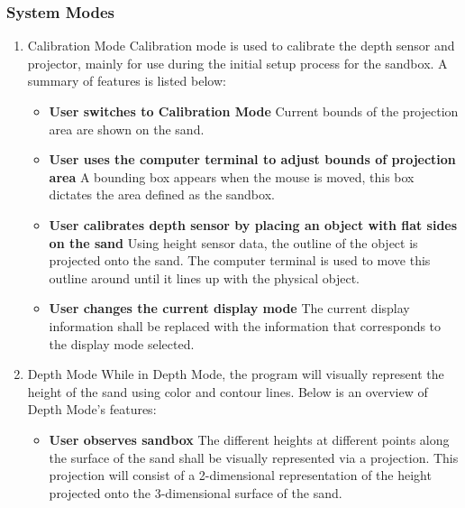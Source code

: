 
\subsubsection{System Modes}
\begin{enumerate}
\item{Calibration Mode}
Calibration mode is used to calibrate the depth sensor and projector, mainly for use during the initial set\-up process for the sandbox. A summary of features is listed below:

\begin{itemize}
\item \textbf{User switches to Calibration Mode}
Current bounds of the projection area are shown on the sand.

\item \textbf{User uses the computer terminal to adjust bounds of projection area}
A bounding box appears when the mouse is moved, this box dictates the area defined as the sandbox.

\item \textbf{User calibrates depth sensor by placing an object with flat sides on the sand}
Using height sensor data, the outline of the object is projected onto the sand. 
The computer terminal is used to move this outline around until it lines up with the physical object.

\item \textbf{User changes the current display mode}
The current display information shall be replaced with the information that corresponds to the display mode selected.
\end{itemize}

\item{Depth Mode}
While in Depth Mode, the program will visually represent the height of the sand using color and contour lines. Below is an overview of Depth Mode's features:

\begin{itemize}
\item \textbf{User observes sandbox}
The different heights at different points along the surface of the sand shall be visually represented via a projection.  This projection will consist of a 2-dimensional representation of the height projected onto the 3-dimensional surface of the sand.


\end{itemize}
\end{enumerate}
